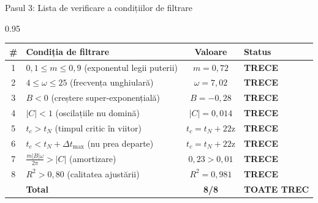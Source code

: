 \documentclass[9pt, aspectratio=169, t]{beamer}
\begin{document}
\begin{frame}{Pasul 3: Lista de verificare a condițiilor de filtrare}
    \begin{cminipage}{0.95\textwidth}
    {\footnotesize
    \begin{center}
        \begin{tabular}{clcl}
            \toprule
            \textbf{\#} & \textbf{Condiția de filtrare} & \textbf{Valoare} & \textbf{Status} \\
            \midrule
            1 & $0{,}1 \leq m \leq 0{,}9$ (exponentul legii puterii) & $m = 0{,}72$ & \textcolor{Forest}{\textbf{TRECE}} \\
            2 & $4 \leq \omega \leq 25$ (frecvența unghiulară) & $\omega = 7{,}02$ & \textcolor{Forest}{\textbf{TRECE}} \\
            3 & $B < 0$ (creștere super-exponențială) & $B = -0{,}28$ & \textcolor{Forest}{\textbf{TRECE}} \\
            4 & $|C| < 1$ (oscilațiile nu domină) & $|C| = 0{,}014$ & \textcolor{Forest}{\textbf{TRECE}} \\
            5 & $t_c > t_N$ (timpul critic în viitor) & $t_c = t_N + 22$z & \textcolor{Forest}{\textbf{TRECE}} \\
            6 & $t_c < t_N + \Delta t_{\max}$ (nu prea departe) & $t_c = t_N + 22$z & \textcolor{Forest}{\textbf{TRECE}} \\
            7 & $\frac{m|B|\omega}{2\pi} > |C|$ (amortizare) & $0{,}23 > 0{,}01$ & \textcolor{Forest}{\textbf{TRECE}} \\
            8 & $R^2 > 0{,}80$ (calitatea ajustării) & $R^2 = 0{,}981$ & \textcolor{Forest}{\textbf{TRECE}} \\
            \midrule
            & \textbf{Total} & \textbf{8/8} & \textcolor{Forest}{\textbf{TOATE TREC}} \\
            \bottomrule
        \end{tabular}
    \end{center}

}
\end{cminipage}
\end{frame}
\end{document}
